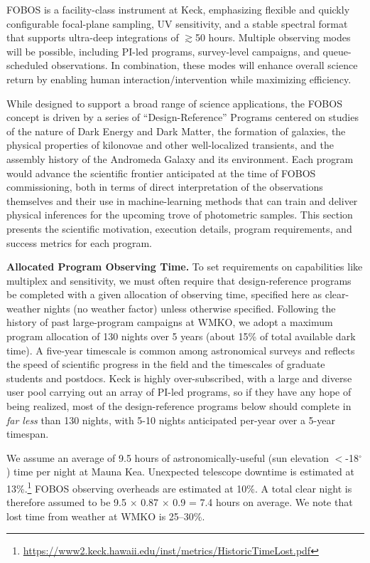 \documentclass[11pt,a4paper,twoside,onecolumn,openany,final,oldfontcommands]{memoir}
\begin{document}

FOBOS is a facility-class instrument at Keck, emphasizing flexible and quickly configurable focal-plane sampling, UV sensitivity, and a stable spectral format that supports ultra-deep integrations of $\gtrsim$50 hours.  Multiple observing modes will be possible, including PI-led programs, survey-level campaigns, and queue-scheduled observations.  In combination, these modes will enhance overall science return by enabling human interaction/intervention while maximizing efficiency.  

While designed to support a broad range of science applications, the FOBOS concept is driven by a series of ``Design-Reference'' Programs centered on studies of the nature of Dark Energy and Dark Matter, the formation of galaxies, the physical properties of kilonovae and other well-localized transients, and the assembly history of the Andromeda Galaxy and its environment.  Each program would advance the scientific frontier anticipated at the time of FOBOS commissioning, both in terms of direct interpretation of the observations themselves and their use in machine-learning methods that can train and deliver physical inferences for the upcoming trove of photometric samples.  This section presents the scientific motivation, execution details, program requirements, and success metrics for each program.

\noindent \textbf{Allocated Program Observing Time.}  To set requirements on capabilities like multiplex and sensitivity, we must often require that design-reference programs be completed with a given allocation of observing time, specified here as clear-weather nights (no weather factor) unless otherwise specified.  Following the history of past large-program campaigns at WMKO, we adopt a maximum program allocation of 130 nights over 5 years (about 15\% of total available dark time).  A five-year timescale is common among astronomical surveys and reflects the speed of scientific progress in the field and the timescales of graduate students and postdocs.  Keck is highly over-subscribed, with a large and diverse user pool carrying out an array of PI-led programs, so if they have any hope of being realized, most of the design-reference programs below should complete in \emph{far less} than 130 nights, with 5-10 nights anticipated per-year over a 5-year timespan.  

We assume an average of 9.5 hours of astronomically-useful (sun elevation $<$-18$^\circ$) time per night at Mauna Kea.  Unexpected telescope downtime is estimated at 13\%.\footnote{\url{https://www2.keck.hawaii.edu/inst/metrics/HistoricTimeLost.pdf}}  FOBOS observing overheads are estimated at 10\%.  A total clear night is therefore assumed to be 9.5 $\times$ 0.87 $\times$ 0.9 = 7.4 hours on average.  We note that lost time from weather at WMKO is 25--30\%.  
\end{document}
